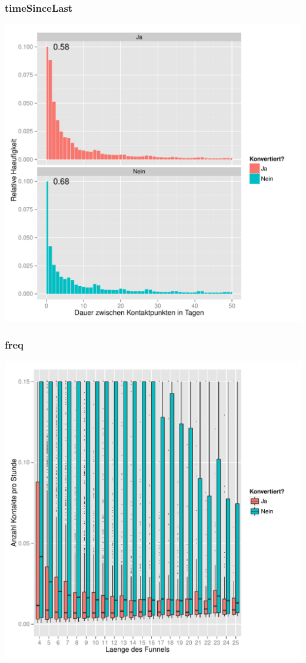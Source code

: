 \begin{frame}\frametitle{timeSinceLast}
	    \centering\includegraphics[scale=0.3]{timeSinceLast.pdf}
\end{frame}

\begin{frame}\frametitle{freq}
	    \centering\includegraphics[scale=0.3]{freq.pdf}
\end{frame}
